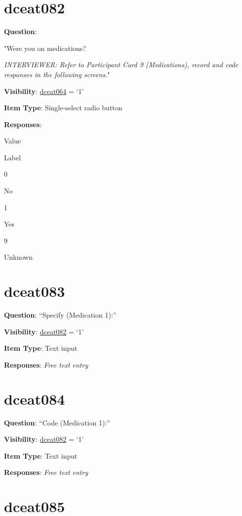 \documentclass[]{book}
\begin{document}
\hypertarget{dceat082}{%
\section{dceat082}\label{dceat082}}

\textbf{Question}:

"Were you on medications?

\emph{INTERVIEWER: Refer to Participant Card 9 (Medications), record and code responses in the following screens.}"

\textbf{Visibility}: \protect\hyperlink{dceat064}{dceat064} = `1'

\textbf{Item Type}: Single-select radio button

\textbf{Responses}:

Value

Label

0

No

1

Yes

9

Unknown

\hypertarget{dceat083}{%
\section{dceat083}\label{dceat083}}

\textbf{Question}: ``Specify (Medication 1):''

\textbf{Visibility}: \protect\hyperlink{dceat082}{dceat082} = `1'

\textbf{Item Type}: Text input

\textbf{Responses}: \emph{Free text entry}

\hypertarget{dceat084}{%
\section{dceat084}\label{dceat084}}

\textbf{Question}: ``Code (Medication 1):''

\textbf{Visibility}: \protect\hyperlink{dceat082}{dceat082} = `1'

\textbf{Item Type}: Text input

\textbf{Responses}: \emph{Free text entry}

\hypertarget{dceat085}{%
\section{dceat085}\label{dceat085}}
\end{document}
